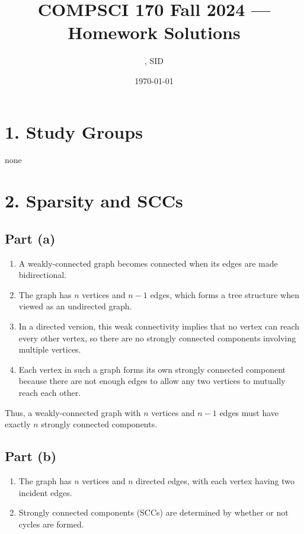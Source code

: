 \documentclass[11pt]{article}
\title{COMPSCI 170 Fall 2024 --- Homework \Homework Solutions}
\author{\Name, SID \SID}
\date{\today}
\begin{document}
\maketitle

\section*{1. Study Groups}

none

\newpage

\section*{2. Sparsity and SCCs}

\subsection*{Part (a)}

\begin{enumerate}
    \item A weakly-connected graph becomes connected when its edges are made bidirectional.
    \item The graph has \( n \) vertices and \( n-1 \) edges, which forms a tree structure when viewed as an undirected graph.
    \item In a directed version, this weak connectivity implies that no vertex can reach every other vertex, so there are no strongly connected components involving multiple vertices.
    \item Each vertex in such a graph forms its own strongly connected component because there are not enough edges to allow any two vertices to mutually reach each other.
\end{enumerate}

Thus, a weakly-connected graph with \( n \) vertices and \( n-1 \) edges must have exactly \( n \) strongly connected components.

\subsection*{Part (b)}

\begin{enumerate}
    \item The graph has \( n \) vertices and \( n \) directed edges, with each vertex having two incident edges.
    \item Strongly connected components (SCCs) are determined by whether or not cycles are formed.
\end{enumerate}
\end{document}
